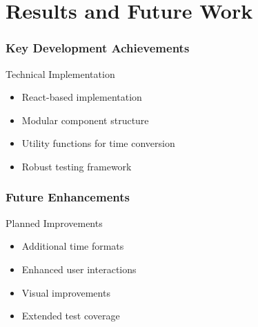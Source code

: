 \documentclass{beamer}
\begin{document}
\section{Results and Future Work}
\begin{frame}
    \frametitle{Key Development Achievements}
    \begin{exampleblock}{Technical Implementation}
        \begin{itemize}
            \item React-based implementation
            \item Modular component structure
            \item Utility functions for time conversion
            \item Robust testing framework
        \end{itemize}
    \end{exampleblock}
\end{frame}

\begin{frame}
    \frametitle{Future Enhancements}
    \begin{block}{Planned Improvements}
        \begin{itemize}
            \item Additional time formats
            \item Enhanced user interactions
            \item Visual improvements
            \item Extended test coverage
        \end{itemize}
    \end{block}
\end{frame}
\end{document}
